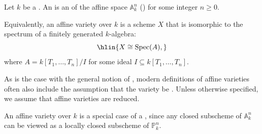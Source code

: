 \begin{definition} \label{definition:affine_variety_over_a_field}
Let $k$ be a . An  is an  of the affine space $\mathbb{A}^n_k$ () for some integer $n \geq 0$.


Equivalently, an affine variety over $k$ is a scheme $X$ that is isomorphic to the spectrum of a finitely generated $k$-algebra:
$$\hlin{X \cong \operatorname{Spec}(A),}$$
where $A = k[T_1, \dots, T_n]/I$ for some ideal $I \subseteq k[T_1, \dots, T_n]$.

As is the case with the general notion of , modern definitions of affine varieties often also include the assumption that the variety be . Unless otherwise specified, we assume that affine varieties are reduced.


An affine variety over $k$ is a special case of a , since any closed subscheme of $\mathbb{A}^n_k$ can be viewed as a locally closed subscheme of $\mathbb{P}^n_k$.
\end{definition}
